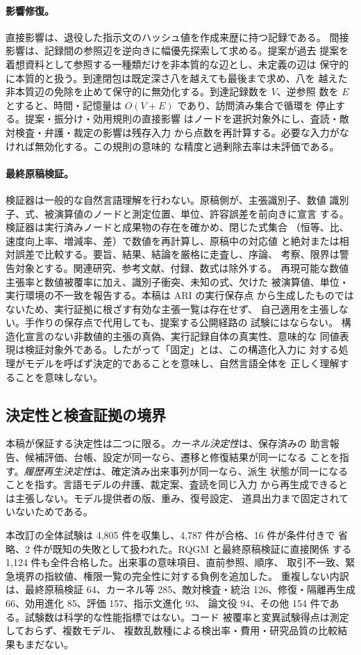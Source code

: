 \paragraph{影響修復。}
直接影響は、退役した指示文のハッシュ値を作成来歴に持つ記録である。
間接影響は、記録間の参照辺を逆向きに幅優先探索して求める。提案が過去
提案を着想資料として参照する一種類だけを非本質的な辺とし、未定義の辺は
保守的に本質的と扱う。到達閉包は既定深さ八を越えても最後まで求め、八を
越えた非本質辺の免除を止めて保守的に無効化する。到達記録数を $V$、逆参照
数を $E$ とすると、時間・記憶量は $O(V+E)$ であり、訪問済み集合で循環を
停止する。提案・振分け・効用規則の直接影響
はノードを選択対象外にし、査読・敵対検査・弁護・裁定の影響は残存入力
から点数を再計算する。必要な入力がなければ無効化する。この規則の意味的
な精度と過剰除去率は未評価である。

\paragraph{最終原稿検証。}
検証器は一般的な自然言語理解を行わない。原稿側が、主張識別子、数値
識別子、式、被演算値のノードと測定位置、単位、許容誤差を前向きに宣言
する。検証器は実行済みノードと成果物の存在を確かめ、閉じた式集合
（恒等、比、速度向上率、増減率、差）で数値を再計算し、原稿中の対応値
と絶対または相対誤差で比較する。要旨、結果、結論を厳格に走査し、序論、
考察、限界は警告対象とする。関連研究、参考文献、付録、数式は除外する。
再現可能な数値主張率と数値被覆率に加え、識別子衝突、未知の式、欠けた
被演算値、単位・実行環境の不一致を報告する。本稿は ARI の実行保存点
から生成したものではないため、実行証拠に根ざす有効な主張一覧は存在せず、
自己適用を主張しない。手作りの保存点で代用しても、提案する公開経路の
試験にはならない。
構造化宣言のない非数値的主張の真偽、実行記録自体の真実性、意味的な
同値表現は検証対象外である。したがって「固定」とは、この構造化入力に
対する処理がモデルを呼ばず決定的であることを意味し、自然言語全体を
正しく理解することを意味しない。

\subsection{決定性と検査証拠の境界}\label{sec:appendix:determinism}

本稿が保証する決定性は二つに限る。\emph{カーネル決定性}は、保存済みの
助言報告、候補評価、台帳、設定が同一なら、遷移と修復結果が同一になる
ことを指す。\emph{履歴再生決定性}は、確定済み出来事列が同一なら、派生
状態が同一になることを指す。言語モデルの弁護、裁定案、査読を同じ入力
から再生成できるとは主張しない。モデル提供者の版、重み、復号設定、
道具出力まで固定されていないためである。

本改訂の全体試験は 4,805 件を収集し、4,787 件が合格、16 件が条件付きで
省略、2 件が既知の失敗として扱われた。RQGM と最終原稿検証に直接関係
する 1,124 件も全件合格した。出来事の意味項目、直前参照、順序、
取引不一致、緊急境界の指紋値、権限一覧の完全性に対する負例を追加した。
重複しない内訳は、最終原稿検証 64、カーネル等 285、敵対検査・統治
126、修復・隔離再生成 66、効用進化 85、評価 157、指示文進化 93、
論文役 94、その他 154 件である。試験数は科学的な性能指標ではない。コード
被覆率と変異試験得点は測定しておらず、複数モデル、
複数乱数種による検出率・費用・研究品質の比較結果もまだない。
